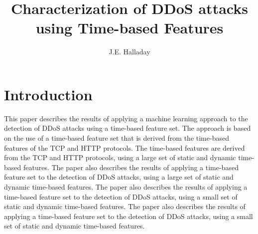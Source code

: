 \documentclass{article}
\title{Characterization of DDoS attacks using Time-based Features}
\author{J.E. Halladay}
\begin{document}
    \maketitle

    \section{Introduction}
        \label{sec:introduction}
    This paper describes the results of applying a machine learning
    approach to the detection of DDoS attacks using a time-based
    feature set. The approach is based on the use of a time-based
    feature set that is derived from the time-based features of the
    TCP and HTTP protocols. The time-based features are derived from
    the TCP and HTTP protocols, using a large set of static and
    dynamic time-based features. The paper also describes the
    results of applying a time-based feature set to the detection of
    DDoS attacks, using a large set of static and dynamic time-based
    features. The paper also describes the results of applying a
    time-based feature set to the detection of DDoS attacks, using a
    small set of static and dynamic time-based features. The paper
    also describes the results of applying a time-based feature set
    to the detection of DDoS attacks, using a small set of static
    and dynamic time-based features.
\end{document}
